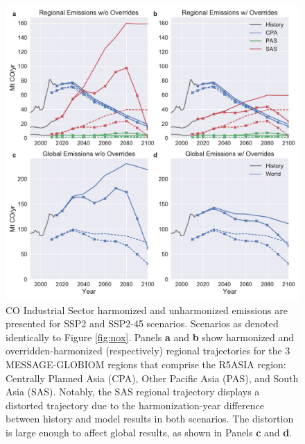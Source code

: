 \documentclass[review]{elsarticle}
\begin{document}
\begin{figure}
  \begin{center}
    \includegraphics[width=\textwidth]{results_CO_Industrial_Sector.pdf}
    \caption[]{
      \label{fig:co}
      CO Industrial Sector harmonized and unharmonized emissions are presented
      for SSP2 and SSP2-45 scenarios. Scenarios as denoted identically to Figure
      \ref{fig:nox}. Panels \textbf{a} and \textbf{b} show harmonized and
      overridden-harmonized (respectively) regional trajectories for the 3
      MESSAGE-GLOBIOM regions that comprise the R5ASIA region: Centrally Planned
      Asia (CPA), Other Pacific Asia (PAS), and South Asia (SAS). Notably, the
      SAS regional trajectory displays a distorted trajectory due to the
      harmonization-year difference between history and model results in both
      scenarios. The distortion is large enough to affect global results, as
      shown in Panels \textbf{c} and \textbf{d}.  
}
  \end{center}
\end{figure}
\end{document}
